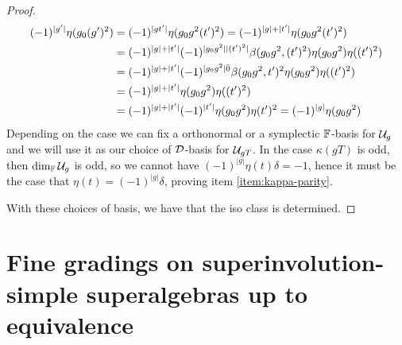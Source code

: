 \begin{proof}
    \begin{align*}
        (-1)^{|g'|} \eta(g_0 (g')^2) &= (-1)^{|gt'|} \eta(g_0 g^2 (t')^2) = (-1)^{|g| + |t'|} \eta(g_0 g^2 (t')^2) \\
        &= (-1)^{|g| + |t'|} (-1)^{|g_0 g^2||(t')^2|} \beta(g_0 g^2, (t')^2)\eta(g_0 g^2) \eta((t')^2)\\
        &= (-1)^{|g| + |t'|} (-1)^{|g_0 g^2| \bar{0} } \beta(g_0 g^2, t')^2 \eta(g_0 g^2) \eta((t')^2) \\
        &= (-1)^{|g| + |t'|} \eta(g_0 g^2) \eta((t')^2) \\ 
        &= (-1)^{|g| + |t'|} (-1)^{|t'|} \eta(g_0 g^2) \eta(t')^2 = (-1)^{|g|} \eta(g_0 g^2)
    \end{align*}
    Depending on the case we can fix a orthonormal or a symplectic $\mathbb{F}$-basis for $\mathcal U_g$ and we will use it as our choice of $\mathcal{D}$-basis for $\mathcal U_{gT}$. 
    In the case $\kappa(gT)$ is odd, then $\dim_{\mathbb{F}} \mathcal U_g$ is odd, so we cannot have $(-1)^{|g|} \eta(t) \delta = -1$, hence it must be the case that $\eta(t) = (-1)^{|g|} \delta$, proving item \eqref{item:kappa-parity}. 
    
    
    With these choices of basis, we have that the iso class is determined.
    
\end{proof}

\section{Fine gradings on superinvolution-simple superalgebras up to equivalence}
